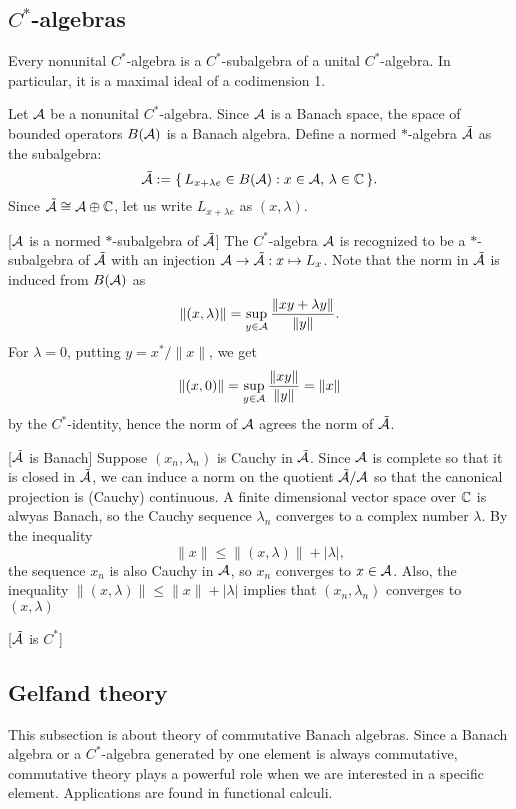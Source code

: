 \documentclass{../crs}
\begin{document}
\subsection{$C^*$-algebras}

\begin{thm}
Every nonunital $C^*$-algebra is a $C^*$-subalgebra of a unital $C^*$-algebra.
In particular, it is a maximal ideal of a codimension 1.
\end{thm}
\begin{pf}
Let $\mathcal{A}$ be a nonunital $C^*$-algebra.
Since $\mathcal{A}$ is a Banach space, the space of bounded operators $B(\mathcal{A})$ is a Banach algebra.
Define a normed $*$-algebra $\tilde{\mathcal{A}}$ as the subalgebra:
\[\tilde{\mathcal{A}}:=\{\,L_{x+\lambda e}\in B(\mathcal{A}):x\in\mathcal{A},\,\lambda\in\mathbb{C}\,\}.\]
Since $\tilde{\mathcal{A}}\cong \mathcal{A}\oplus\mathbb{C}$, let us write $L_{x+\lambda e}$ as $(x,\lambda)$.

[$\mathcal{A}$ is a normed $*$-subalgebra of $\tilde{\mathcal{A}}$]
The $C^*$-algebra $\mathcal{A}$ is recognized to be a $*$-subalgebra of $\tilde{\mathcal{A}}$ with an injection $\cA\to\tilde\cA:x\mapsto L_x$.
Note that the norm in $\tilde{\mathcal{A}}$ is induced from $B(\mathcal{A})$ as
\[\|(x,\lambda)\|=\sup_{y\in\mathcal{A}}\frac{\|xy+\lambda y\|}{\|y\|}.\]
For $\lambda=0$, putting $y=x^*/\|x\|$, we get
\[\|(x,0)\|=\sup_{y\in\mathcal{A}}\frac{\|xy\|}{\|y\|}=\|x\|\]
by the $C^*$-identity, hence the norm of $\mathcal{A}$ agrees the norm of $\tilde{\mathcal{A}}$.

[$\tilde{\mathcal{A}}$ is Banach]
Suppose $(x_n,\lambda_n)$ is Cauchy in $\tilde{\mathcal{A}}$.
Since $\mathcal{A}$ is complete so that it is closed in $\tilde{\mathcal{A}}$, we can induce a norm on the quotient $\tilde{\mathcal{A}}/\mathcal{A}$ so that the canonical projection is (Cauchy) continuous.
A finite dimensional vector space over $\mathbb{C}$ is alwyas Banach, so the Cauchy sequence $\lambda_n$ converges to a complex number $\lambda$.
By the inequality
\[\|x\|\le\|(x,\lambda)\|+|\lambda|,\]
the sequence $x_n$ is also Cauchy in $\mathcal{A}$, so $x_n$ converges to $x\in\mathcal{A}$.
Also, the inequality $\|(x,\lambda)\|\le\|x\|+|\lambda|$ implies that $(x_n,\lambda_n)$ converges to $(x,\lambda)$

[$\tilde{\mathcal{A}}$ is $C^*$]
\end{pf}




\subsection{Gelfand theory}
This subsection is about theory of commutative Banach algebras.
Since a Banach algebra or a $C^*$-algebra generated by one element is always commutative, commutative theory plays a powerful role when we are interested in a specific element.
Applications are found in functional calculi.
\end{document}
